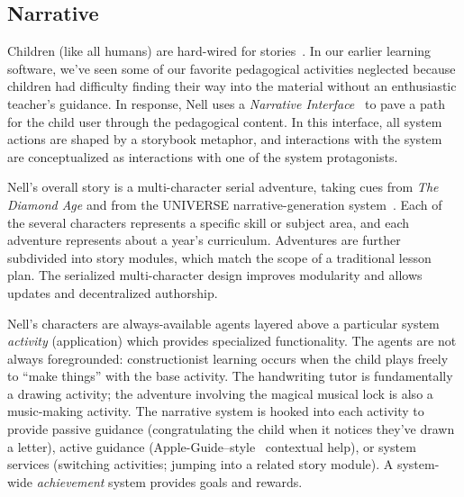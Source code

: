 \documentclass[preprint]{sig-alternate}
\begin{document}

\subsection{Narrative}

Children (like all humans) are hard-wired for stories~\cite{boyd:stories}.
In our earlier learning software, we've seen some of our favorite
pedagogical activities neglected because children had difficulty
finding their way into the material without an enthusiastic teacher's
guidance.  In response, Nell uses a
\textit{Narrative Interface}~\cite{bizzocchi:narrative,don:narrative}
to pave a path for the child user through the pedagogical content.
In this interface, all system actions are shaped by a storybook metaphor, and
interactions with the system are conceptualized as interactions with one of the
system protagonists.

Nell's overall story is a multi-character serial adventure, taking
cues from \textit{The Diamond Age} and
from the UNIVERSE narrative-generation system~\cite{lebowitz:universe85}.
Each of the several characters represents a specific skill or subject
area, and each adventure represents about a year's curriculum.
Adventures are further subdivided into story modules, which match the
scope of a traditional lesson plan.  The serialized multi-character
design improves modularity and allows updates and decentralized
authorship.


Nell's characters are
always-available agents layered above a particular system \textit{activity}
(application) which provides specialized functionality.  The agents
are not always foregrounded: constructionist learning occurs when the
child plays freely to ``make things'' with the base activity.
The handwriting tutor is fundamentally a drawing activity; the
adventure involving the magical musical lock is also a music-making activity.
The narrative system is
hooked into each activity to provide passive guidance
(congratulating the child when it notices they've drawn a letter),
active guidance (Apple-Guide--style~\cite{powers:appleguide}
contextual help), or system services (switching activities; jumping into a
related story module).  A system-wide \textit{achievement} system provides
goals and rewards.
\end{document}
